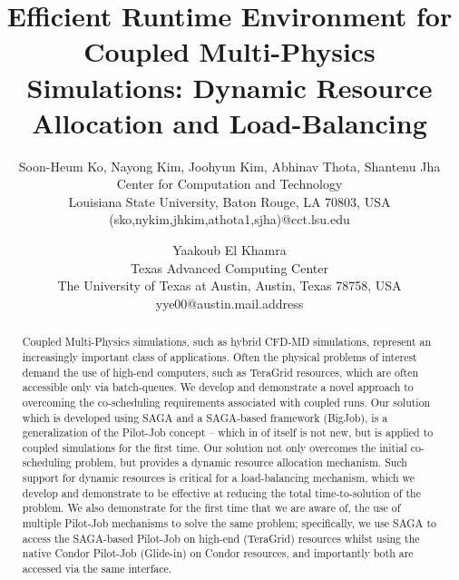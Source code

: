 \documentclass[times, 10pt,twocolumn]{article}
\begin{document}
\title{Efficient Runtime Environment for Coupled Multi-Physics Simulations: Dynamic Resource Allocation and Load-Balancing}

\author{Soon-Heum Ko, Nayong Kim, Joohyun Kim, Abhinav Thota, Shantenu Jha\\
Center for Computation and Technology\\
Louisiana State University, Baton Rouge, LA 70803, USA\\
(sko,nykim,jhkim,athota1,sjha)@cct.lsu.edu\\
\and
Yaakoub El Khamra\\
Texas Advanced Computing Center\\
The University of Texas at Austin, Austin, Texas 78758, USA\\
yye00@austin.mail.address\\
}


\maketitle
\thispagestyle{empty}

\begin{abstract}
  Coupled Multi-Physics simulations, such as hybrid CFD-MD simulations, represent an increasingly important class of applications.  Often the physical problems of interest demand the use of high-end computers, such as TeraGrid resources, which are often accessible only via batch-queues.  We develop and demonstrate a novel approach to overcoming the co-scheduling requirements associated with coupled runs.  Our solution which is developed using SAGA and a SAGA-based framework (BigJob), is a generalization of the Pilot-Job concept -- which in of itself is not new, but is applied to coupled simulations for the first time.  Our solution not only overcomes the initial co-scheduling problem, but provides a dynamic resource allocation mechanism. Such support for dynamic resources is critical for a load-balancing mechanism, which we develop and demonstrate to be effective at reducing the total time-to-solution of the problem.  We also demonstrate for the first time that we are aware of, the use of multiple Pilot-Job mechanisms to solve the same problem; specifically, we use SAGA to access the SAGA-based Pilot-Job on high-end (TeraGrid) resources whilst using the native Condor Pilot-Job (Glide-in) on Condor resources, and importantly both are accessed via the same interface. 
\end{abstract}
\end{document}
